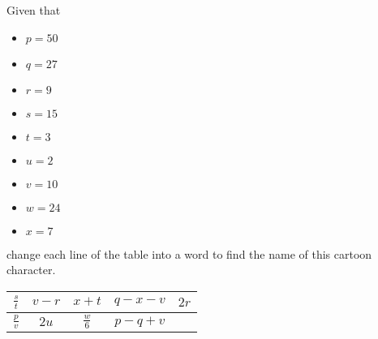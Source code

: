 \vspace{3 mm}
\noindent Given that 
\begin{multicols}{3}
	\begin{itemize}
		\item $p = 50$
		\item $q = 27$
		\item $r = 9$
		\item $s = 15$
		\item $t = 3$
		\item $u = 2$
		\item $v = 10$
		\item $w = 24$
		\item $x = 7$
	\end{itemize}
\end{multicols}
\noindent change each line of the table into a word to find the name of this cartoon character.

\vspace{3 mm}

\renewcommand{\arraystretch}{3}
\begin{tabular}{|c|c|c|c|c|}
\hline
$\displaystyle \frac{s}{t}$ & $v - r$ & $x + t$ & $q - x - v$ & $2r$ \\
\hline
$\displaystyle \frac{p}{v}$ & $2u$ & $\displaystyle \frac{w}{6}$ & $p - q + v$& \\
\hline
\end{tabular}

\vspace{3 mm}

